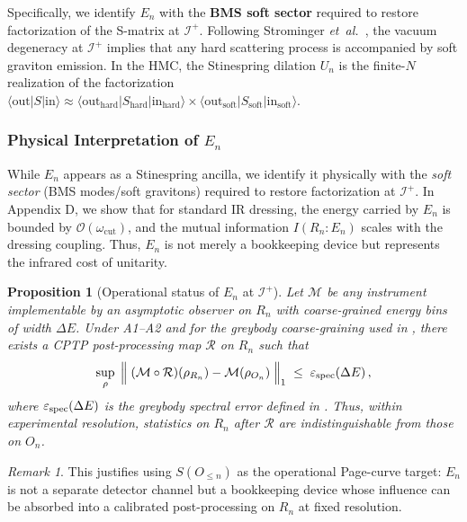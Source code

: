 \documentclass[11pt,a4paper]{article}
\newcommand{\etal}{\textit{et~al.}\xspace}
\theoremstyle{plain}
\newtheorem{proposition}[theorem]{Proposition}
\theoremstyle{definition}
\theoremstyle{remark}
\newtheorem{remark}[theorem]{Remark}
\begin{document}
Specifically, we identify $E_n$ with the \textbf{BMS soft sector} required to restore factorization of the S-matrix at $\mathscr{I}^+$.
Following Strominger \etal~\cite{HPS:2016}, the vacuum degeneracy at $\mathscr{I}^+$ implies that any hard scattering process is accompanied by soft graviton emission. In the HMC, the Stinespring dilation $U_n$ is the finite-$N$ realization of the factorization $\langle \text{out} | S | \text{in} \rangle \approx \langle \text{out}_{\text{hard}} | S_{\text{hard}} | \text{in}_{\text{hard}} \rangle \times \langle \text{out}_{\text{soft}} | S_{\text{soft}} | \text{in}_{\text{soft}} \rangle$.

\subsubsection{Physical Interpretation of $E_n$}
While $E_n$ appears as a Stinespring ancilla, we identify it physically with the \emph{soft sector} (BMS modes/soft gravitons) required to restore factorization at $\mathscr{I}^+$.
In Appendix D, we show that for standard IR dressing, the energy carried by $E_n$ is bounded by $\mathcal{O}(\omega_{\text{cut}})$, and the mutual information $I(R_n:E_n)$ scales with the dressing coupling.
Thus, $E_n$ is not merely a bookkeeping device but represents the infrared cost of unitarity.

\begin{proposition}[Operational status of $E_n$ at $\mathscr{I}^+$]\label{prop:En-operational}
Let $\mathcal{M}$ be any instrument implementable by an asymptotic observer on $R_n$ with coarse-grained energy bins of width $\Delta E$. Under A1--A2 and for the greybody coarse-graining used in , there exists a CPTP post-processing map $\mathcal{R}$ on $R_n$ such that
\begin{equation*}
\sup_{\rho}\;\Big\|\; (\mathcal{M}\circ\mathcal{R})(\rho_{R_n}) - \mathcal{M}(\rho_{O_n}) \;\Big\|_1 \;\le\; \varepsilon_{\rm spec}(\Delta E)\,,
\end{equation*}
where $\varepsilon_{\rm spec}(\Delta E)$ is the greybody spectral error defined in . Thus, within experimental resolution, statistics on $R_n$ after $\mathcal{R}$ are indistinguishable from those on $O_n$.
\end{proposition}
\begin{remark}
This justifies using $S(O_{\le n})$ as the operational Page-curve target: $E_n$ is not a separate detector channel but a bookkeeping device whose influence can be absorbed into a calibrated post-processing on $R_n$ at fixed resolution.
\end{remark}
\end{document}
